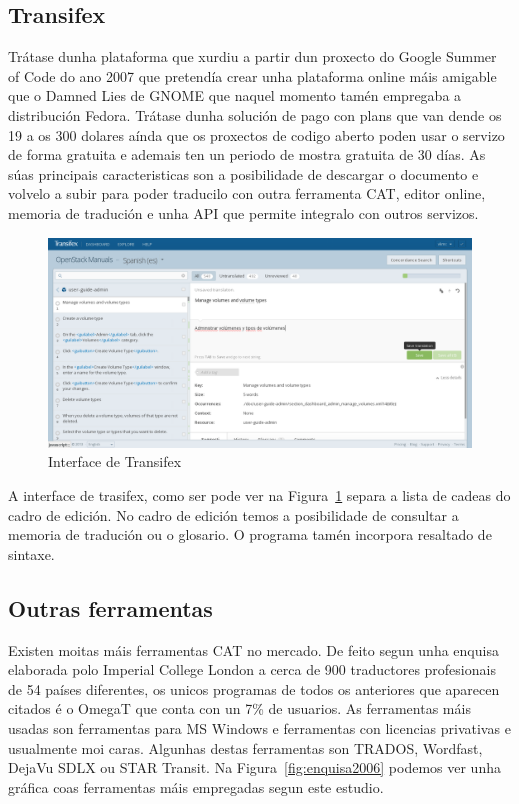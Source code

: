 \subsection{Transifex}
Trátase dunha plataforma que xurdiu a partir dun proxecto do Google Summer of Code do ano 2007 que pretendía crear unha plataforma online máis amigable que o Damned Lies de GNOME que naquel momento tamén empregaba a distribución Fedora. Trátase dunha solución de pago con plans que van dende os 19 a os 300 dolares aínda que os proxectos de codigo aberto poden usar o servizo de forma gratuita e ademais ten un periodo de mostra gratuita de 30 días. As súas principais caracteristicas son a posibilidade de descargar o documento e volvelo a subir para poder traducilo con outra ferramenta CAT, editor online, memoria de tradución e unha API que permite integralo con outros servizos.

\begin{figure}[h]
    \centering
    \includegraphics[width=\textwidth]{img/captura_transifex.png}
    \caption{Interface de Transifex}
    \label{fig:transifex}
\end{figure}

A interface de trasifex, como ser pode ver na Figura~\ref{fig:transifex} separa a lista de cadeas do cadro de edición. No cadro de edición temos a posibilidade de consultar a memoria de tradución ou o glosario. O programa tamén incorpora resaltado de sintaxe.

\subsection{Outras ferramentas}
Existen moitas máis ferramentas CAT no mercado. De feito segun unha enquisa \cite{article:2006survey} elaborada polo Imperial College London a cerca de 900 traductores profesionais de 54 países diferentes, os unicos programas de todos os anteriores que aparecen citados é o OmegaT que conta con un 7\% de usuarios. As ferramentas máis usadas son ferramentas para MS Windows e ferramentas con licencias privativas e usualmente moi caras. Algunhas destas ferramentas son TRADOS, Wordfast, DejaVu SDLX ou STAR Transit. Na Figura~\ref{fig:enquisa2006} podemos ver unha gráfica coas ferramentas máis empregadas segun este estudio.

